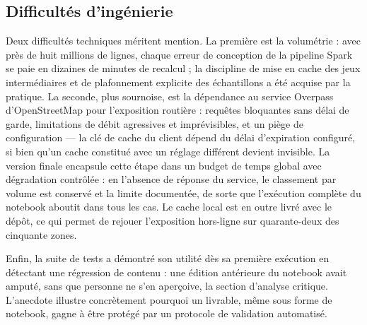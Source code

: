 \subsection{Difficultés d'ingénierie}

Deux difficultés techniques méritent mention. La première est la volumétrie :
avec près de huit millions de lignes, chaque erreur de conception de la
pipeline Spark se paie en dizaines de minutes de recalcul ; la discipline de
mise en cache des jeux intermédiaires et de plafonnement explicite des
échantillons a été acquise par la pratique. La seconde, plus sournoise, est
la dépendance au service Overpass d'OpenStreetMap pour l'exposition
routière : requêtes bloquantes sans délai de garde, limitations de débit
agressives et imprévisibles, et un piège de configuration — la clé de cache
du client dépend du délai d'expiration configuré, si bien qu'un cache
constitué avec un réglage différent devient invisible. La version finale
encapsule cette étape dans un budget de temps global avec dégradation
contrôlée : en l'absence de réponse du service, le classement par volume est
conservé et la limite documentée, de sorte que l'exécution complète du
notebook aboutit dans tous les cas. Le cache local est en outre livré avec le
dépôt, ce qui permet de rejouer l'exposition hors-ligne sur quarante-deux des
cinquante zones.

Enfin, la suite de tests a démontré son utilité dès sa première exécution en
détectant une régression de contenu : une édition antérieure du notebook
avait amputé, sans que personne ne s'en aperçoive, la section d'analyse
critique. L'anecdote illustre concrètement pourquoi un livrable, même sous
forme de notebook, gagne à être protégé par un protocole de validation
automatisé.

